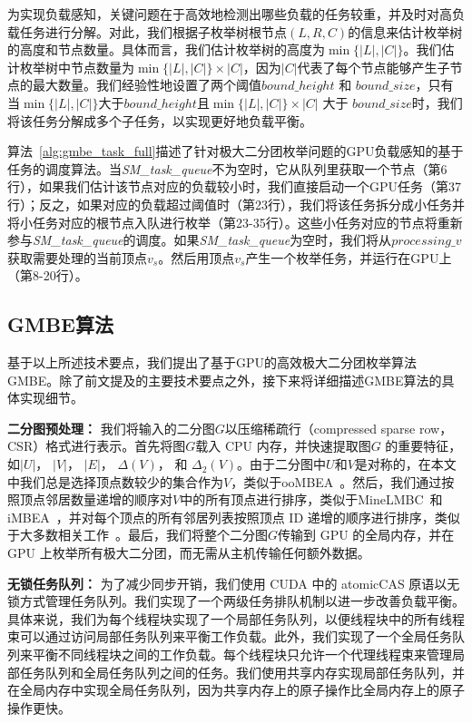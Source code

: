 为实现负载感知，关键问题在于高效地检测出哪些负载的任务较重，并及时对高负载任务进行分解。对此，我们根据子枚举树根节点$(L,R,C)$的信息来估计枚举树的高度和节点数量。具体而言，我们估计枚举树的高度为$\min\{|L|,|C|\}$。我们估计枚举树中节点数量为$\min\{|L|,|C|\}\times|C|$，因为$|C|$代表了每个节点能够产生子节点的最大数量。我们经验性地设置了两个阈值$bound\_height$ 和 $bound\_size$，只有当$\min\{|L|,|C|\}$大于$bound\_height$且$\min\{|L|,|C|\}\times|C|$ 大于 $bound\_size$时，我们将该任务分解成多个子任务，以实现更好地负载平衡。

算法~\ref{alg:gmbe_task_full}描述了针对极大二分团枚举问题的GPU负载感知的基于任务的调度算法。当\textit{SM\_task\_queue}不为空时，它从队列里获取一个节点（第6行），如果我们估计该节点对应的负载较小时，我们直接启动一个GPU任务（第37行）；反之，如果对应的负载超过阈值时（第23行），我们将该任务拆分成小任务并将小任务对应的根节点入队进行枚举（第23-35行）。这些小任务对应的节点将重新参与\textit{SM\_task\_queue}的调度。如果\textit{SM\_task\_queue}为空时，我们将从$processing\_v$获取需要处理的当前顶点$v_s$。然后用顶点$v_s$产生一个枚举任务，并运行在GPU上（第8-20行）。



\subsection{GMBE算法}

基于以上所述技术要点，我们提出了基于GPU的高效极大二分团枚举算法GMBE。除了前文提及的主要技术要点之外，接下来将详细描述GMBE算法的具体实现细节。

\textbf{二分图预处理：} 我们将输入的二分图$G$以压缩稀疏行（compressed sparse row，CSR）格式进行表示。首先将图$G$载入 CPU 内存，并快速提取图$G$ 的重要特征，如$|U|$， $|V|$， $|E|$， 
$\Delta(V)$， 和 $\Delta_2(V)$。由于二分图中$U$和$V$是对称的，在本文中我们总是选择顶点数较少的集合作为$V$，类似于ooMBEA~\cite{ooMBE22}。然后，我们通过按照顶点邻居数量递增的顺序对$V$中的所有顶点进行排序，类似于MineLMBC~\cite{minel06}和iMBEA~\cite{iMBEA14}，并对每个顶点的所有邻居列表按照顶点 ID 递增的顺序进行排序，类似于大多数相关工作~\cite{g2miner22,Kclique22}。最后，我们将整个二分图$G$传输到 GPU 的全局内存，并在 GPU 上枚举所有极大二分团，而无需从主机传输任何额外数据。

\textbf{无锁任务队列：} 为了减少同步开销，我们使用 CUDA 中的 \textsf{atomicCAS} 原语以无锁方式管理任务队列。我们实现了一个两级任务排队机制以进一步改善负载平衡。具体来说，我们为每个线程块实现了一个局部任务队列，以便线程块中的所有线程束可以通过访问局部任务队列来平衡工作负载。此外，我们实现了一个全局任务队列来平衡不同线程块之间的工作负载。每个线程块只允许一个代理线程束来管理局部任务队列和全局任务队列之间的任务。我们使用共享内存实现局部任务队列，并在全局内存中实现全局任务队列，因为共享内存上的原子操作比全局内存上的原子操作更快。

